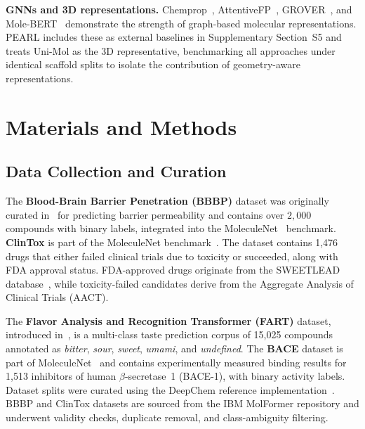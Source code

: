 \documentclass[9pt,twocolumn,conference]{IEEEtran}
\begin{document}
\textbf{GNNs and 3D representations.}
Chemprop~\cite{yang2019chemprop}, AttentiveFP~\cite{xiong2020attentivefp}, GROVER~\cite{rong2020grover}, and Mole-BERT~\cite{xia2023molecbert} demonstrate the strength of graph-based molecular representations.
PEARL includes these as external baselines in Supplementary Section~S5 and treats Uni-Mol as the 3D representative, benchmarking all approaches under identical scaffold splits to isolate the contribution of geometry-aware representations.

\section{Materials and Methods}

\subsection{Data Collection and Curation}
The \textbf{Blood-Brain Barrier Penetration (BBBP)} dataset was originally curated in~\cite{martins2012bayesian} for predicting barrier permeability and contains over $2,000$ compounds with binary labels, integrated into the MoleculeNet~\cite{wu2018moleculenet} benchmark. \textbf{ClinTox} is part of the MoleculeNet benchmark~\cite{wu2018moleculenet}. The dataset contains 1,476 drugs that either failed clinical trials due to toxicity or succeeded, along with FDA approval status. FDA-approved drugs originate from the SWEETLEAD database~\cite{novick2013sweetlead}, while toxicity-failed candidates derive from the Aggregate Analysis of Clinical Trials (AACT).

The \textbf{Flavor Analysis and Recognition Transformer (FART)} dataset, introduced in~\cite{zimmermann2024fart}, is a multi-class taste prediction corpus of 15,025 compounds annotated as \textit{bitter}, \textit{sour}, \textit{sweet}, \textit{umami}, and \textit{undefined}. The \textbf{BACE} dataset is part of MoleculeNet~\cite{wu2018moleculenet} and contains experimentally measured binding results for 1,513 inhibitors of human $\beta$-secretase~1 (BACE-1), with binary activity labels. Dataset splits were curated using the DeepChem reference implementation~\cite{ramsundar2019deep}. BBBP and ClinTox datasets are sourced from the IBM MolFormer repository and underwent validity checks, duplicate removal, and class-ambiguity filtering.
\end{document}
